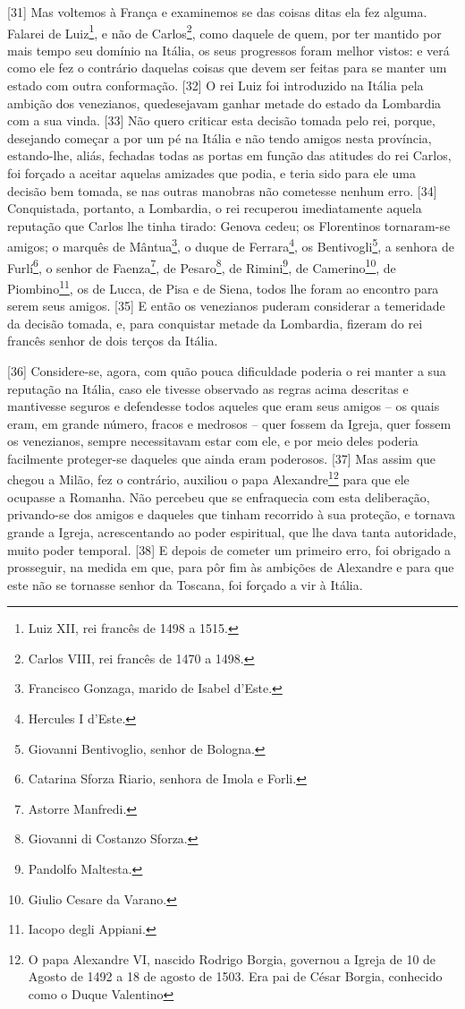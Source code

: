 {[}31{]} Mas voltemos à França e examinemos se das coisas ditas ela fez
alguma. Falarei de Luiz\footnote{Luiz XII, rei francês de 1498 a 1515.},
e não de Carlos\footnote{Carlos VIII, rei francês de 1470 a 1498.}, como
daquele de quem, por ter mantido por mais tempo seu domínio na Itália,
os seus progressos foram melhor vistos: e verá como ele fez o contrário
daquelas coisas que devem ser feitas para se manter um estado com outra
conformação. {[}32{]} O rei Luiz foi introduzido na Itália pela ambição
dos venezianos, quedesejavam ganhar metade do estado da Lombardia com a
sua vinda. {[}33{]} Não quero criticar esta decisão tomada pelo rei,
porque, desejando começar a por um pé na Itália e não tendo amigos nesta
província, estando-lhe, aliás, fechadas todas as portas em função das
atitudes do rei Carlos, foi forçado a aceitar aquelas amizades que
podia, e teria sido para ele uma decisão bem tomada, se nas outras
manobras não cometesse nenhum erro. {[}34{]} Conquistada, portanto, a
Lombardia, o rei recuperou imediatamente aquela reputação que Carlos lhe
tinha tirado: Genova cedeu; os Florentinos tornaram-se amigos; o marquês
de Mântua\footnote{Francisco Gonzaga, marido de Isabel d'Este.}, o duque
de Ferrara\footnote{Hercules I d'Este.}, os Bentivogli\footnote{Giovanni
  Bentivoglio, senhor de Bologna.}, a senhora de Furlí\footnote{Catarina
  Sforza Riario, senhora de Imola e Forli.}, o senhor de
Faenza\footnote{Astorre Manfredi.}, de Pesaro\footnote{Giovanni di
  Costanzo Sforza.}, de Rimini\footnote{Pandolfo Maltesta.}, de
Camerino\footnote{Giulio Cesare da Varano.}, de Piombino\footnote{Iacopo
  degli Appiani.}, os de Lucca, de Pisa e de Siena, todos lhe foram ao
encontro para serem seus amigos. {[}35{]} E então os venezianos puderam
considerar a temeridade da decisão tomada, e, para conquistar metade da
Lombardia, fizeram do rei francês senhor de dois terços da Itália.

{[}36{]} Considere-se, agora, com quão pouca dificuldade poderia o rei
manter a sua reputação na Itália, caso ele tivesse observado as regras
acima descritas e mantivesse seguros e defendesse todos aqueles que eram
seus amigos -- os quais eram, em grande número, fracos e medrosos --
quer fossem da Igreja, quer fossem os venezianos, sempre necessitavam
estar com ele, e por meio deles poderia facilmente proteger-se daqueles
que ainda eram poderosos. {[}37{]} Mas assim que chegou a Milão, fez o
contrário, auxiliou o papa Alexandre\footnote{O papa Alexandre VI,
  nascido Rodrigo Borgia, governou a Igreja de 10 de Agosto de 1492 a 18
  de agosto de 1503. Era pai de César Borgia, conhecido como o Duque
  Valentino} para que ele ocupasse a Romanha. Não percebeu que se
enfraquecia com esta deliberação, privando-se dos amigos e daqueles que
tinham recorrido à sua proteção, e tornava grande a Igreja,
acrescentando ao poder espiritual, que lhe dava tanta autoridade, muito
poder temporal. {[}38{]} E depois de cometer um primeiro erro, foi
obrigado a prosseguir, na medida em que, para pôr fim às ambições de
Alexandre e para que este não se tornasse senhor da Toscana, foi forçado
a vir à Itália.

